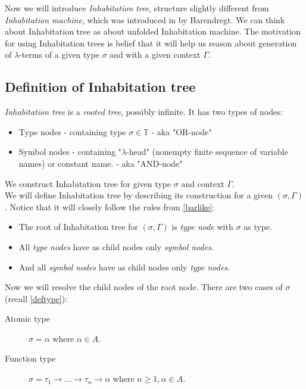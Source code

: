 \documentclass[12pt,a4paper]{report}
\newcommand{\lterms}{$\lambda$-terms\xspace}
\begin{document}
Now we will introduce \textit{Inhabitation tree}, structure slightly different from
\textit{Inhabitation machine}, which was introduced in \cite{barendregt10} by Barendregt.
We can think about Inhabitation tree as about unfolded Inhabitation machine.
The motivation for using Inhabitation trees is belief that it will help us 
reason about generation of \lterms 
of a given type $\sigma$ and with a given context $\Gamma$.  

\subsection{Definition of Inhabitation tree}

\textit{Inhabitation tree} is a \textit{rooted tree}, possibly infinite. 
It has two types of nodes:

\begin{samepage}
\begin{itemize}
  \item Type nodes   
  			- containing type $\sigma \in \mathbb{T}$ 
  			- aka "OR-node" %
  \item Symbol nodes 
  			- containing "$\lambda$-head" (nonempty finite sequence of variable names) or constant
  			  name. 
  			- aka "AND-node" %
\end{itemize}
\end{samepage}

We construct Inhabitation tree for given type $\sigma$ and context $\Gamma$.\\
We will define Inhabitation tree by describing its construction for a given $(\sigma,\Gamma)$.
Notice that it will closely follow the rules from \ref{barlike}:

\begin{itemize}
\item The root of Inhabitation tree for $(\sigma,\Gamma)$ is 
      \textit{type node} with $\sigma$ as type.
\item All \textit{type nodes} have as child nodes only \textit{symbol nodes}. 
\item And all \textit{symbol nodes} have as child nodes only \textit{type nodes}. 
\end{itemize}

\begin{samepage}
Now we will resolve the child nodes of the root node.
There are two cases of $\sigma$ (recall \ref{deftype}): 
\begin{description}
	\item[Atomic type] 
		$\sigma = \alpha $ where $\alpha \in A$. 
	\item[Function type] 
		$\sigma = \tau_1 \rightarrow \dots \rightarrow \tau_n \rightarrow \alpha$
		where $n \geq 1, \alpha \in A$.
\end{description}
\end{samepage}
\end{document}
